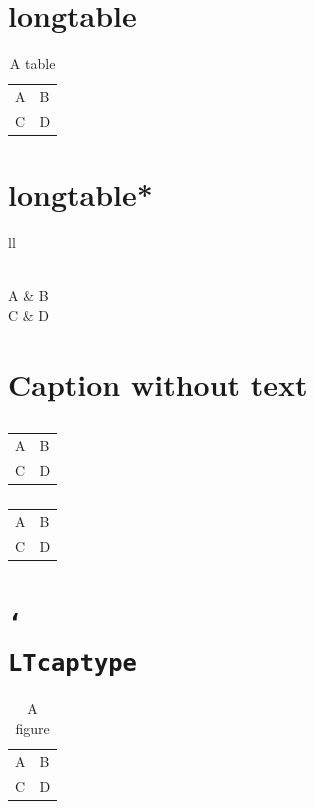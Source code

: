 \documentclass{article}
\providecommand*\cs[1]{\texttt{\char`\\#1}}
\begin{document}
\listoftables

\section{longtable}

\begin{longtable}{ll}
\caption{A table}\\
A & B \\
C & D \\
\end{longtable}

\section{longtable*}

\begin{longtable*}{ll}  %
\caption*{A table}\\
A & B \\
C & D \\
\end{longtable*}

\section{Caption without text}

\begin{longtable}{ll}
\caption{}\\  %
A & B \\
C & D \\
\end{longtable}

\begin{longtable}{ll}
\caption[]{}\\  %
A & B \\
C & D \\
\end{longtable}

\section{\cs{LTcaptype}}

\renewcommand\LTcaptype{figure}
\begin{longtable}{ll}
\caption{A figure}\\
A & B \\
C & D \\
\end{longtable}
\renewcommand\LTcaptype{table}
\end{document}
